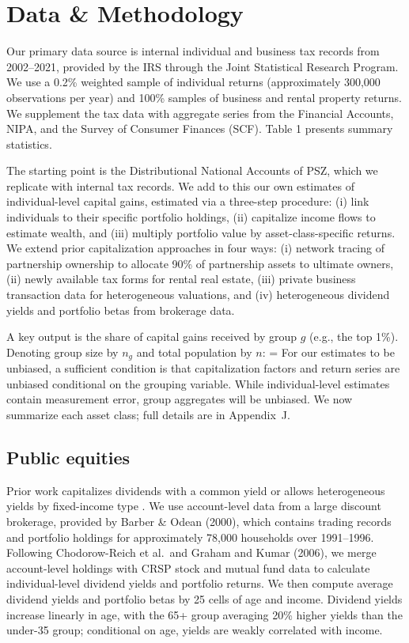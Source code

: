 
\section{Data \& Methodology}

Our primary data source is internal individual and business tax records from 2002--2021, provided by the IRS through the Joint Statistical Research Program. We use a 0.2\% weighted sample of individual returns (approximately 300,000 observations per year) and 100\% samples of business and rental property returns. We supplement the tax data with aggregate series from the Financial Accounts, NIPA, and the Survey of Consumer Finances (SCF). Table 1 presents summary statistics.

The starting point is the Distributional National Accounts of PSZ, which we replicate with internal tax records. We add to this our own estimates of individual-level capital gains, estimated via a three-step procedure: (i) link individuals to their specific portfolio holdings, (ii) capitalize income flows to estimate wealth, and (iii) multiply portfolio value by asset-class-specific returns. We extend prior capitalization approaches in four ways: (i) network tracing of partnership ownership to allocate 90\% of partnership assets to ultimate owners, (ii) newly available tax forms for rental real estate, (iii) private business transaction data for heterogeneous valuations, and (iv) heterogeneous dividend yields and portfolio betas from brokerage data.

A key output is the share of capital gains received by group $g$ (e.g., the top 1\%). Denoting group size by $n_g$ and total population by $n$:
\be
{} = 
\ee
For our estimates to be unbiased, a sufficient condition is that capitalization factors and return series are unbiased conditional on the grouping variable. While individual-level estimates contain measurement error, group aggregates will be unbiased. We now summarize each asset class; full details are in Appendix~J.

\subsection{Public equities}

Prior work capitalizes dividends with a common yield \citep{piketty2016distributional} or allows heterogeneous yields by fixed-income type \citep{smith2023}. We use account-level data from a large discount brokerage, provided by Barber \& Odean (2000), which contains trading records and portfolio holdings for approximately 78,000 households over 1991--1996. Following Chodorow-Reich et al.\ and Graham and Kumar (2006), we merge account-level holdings with CRSP stock and mutual fund data to calculate individual-level dividend yields and portfolio returns. We then compute average dividend yields and portfolio betas by 25 cells of age and income. Dividend yields increase linearly in age, with the 65+ group averaging 20\% higher yields than the under-35 group; conditional on age, yields are weakly correlated with income.

